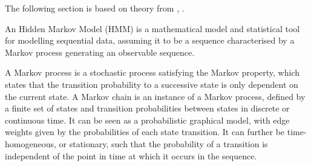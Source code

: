 The following section is based on theory from \citep{kondaveeti:clusters}, \citep{HMMstanford}.

An Hidden Markov Model (\ac{HMM}) is a mathematical model and statistical tool for modelling sequential data, assuming it to be a sequence characterised by a Markov process generating an observable sequence. 









A Markov process is a stochastic process satisfying the Markov property, which states that the transition probability to a successive state is only dependent on the current state. A Markov chain is an instance of a Markov process, defined by a finite set of states and transition probabilities between states in discrete or continuous time. 
It can be seen as a probabilistic graphical model, with edge weights given by the probabilities of each state transition. It can further be time-homogeneous, or stationary, such that the probability of a transition is independent of the point in time at which it occurs in the sequence. 

